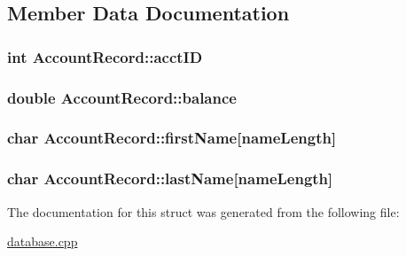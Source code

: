 \subsection{Member Data Documentation}
\hypertarget{struct_account_record_a587aa92adcd387d37427cd19c69e5932}{
\subsubsection[{acct\+I\+D}]{\setlength{\rightskip}{0pt plus 5cm}int Account\+Record\+::acct\+I\+D}}\label{struct_account_record_a587aa92adcd387d37427cd19c69e5932}
\hypertarget{struct_account_record_a7de857c68a45702a0c1c4720b4570c2a}{
\subsubsection[{balance}]{\setlength{\rightskip}{0pt plus 5cm}double Account\+Record\+::balance}}\label{struct_account_record_a7de857c68a45702a0c1c4720b4570c2a}
\hypertarget{struct_account_record_a89df48cc152b78efda9060a0cc461dd1}{
\subsubsection[{first\+Name}]{\setlength{\rightskip}{0pt plus 5cm}char Account\+Record\+::first\+Name\mbox{[}{\bf name\+Length}\mbox{]}}}\label{struct_account_record_a89df48cc152b78efda9060a0cc461dd1}
\hypertarget{struct_account_record_ab9b4c37852573096dd9c81bec70f68b9}{
\subsubsection[{last\+Name}]{\setlength{\rightskip}{0pt plus 5cm}char Account\+Record\+::last\+Name\mbox{[}{\bf name\+Length}\mbox{]}}}\label{struct_account_record_ab9b4c37852573096dd9c81bec70f68b9}


The documentation for this struct was generated from the following file\+:\begin{DoxyCompactItemize}
\item 
\hyperlink{database_8cpp}{database.\+cpp}\end{DoxyCompactItemize}
